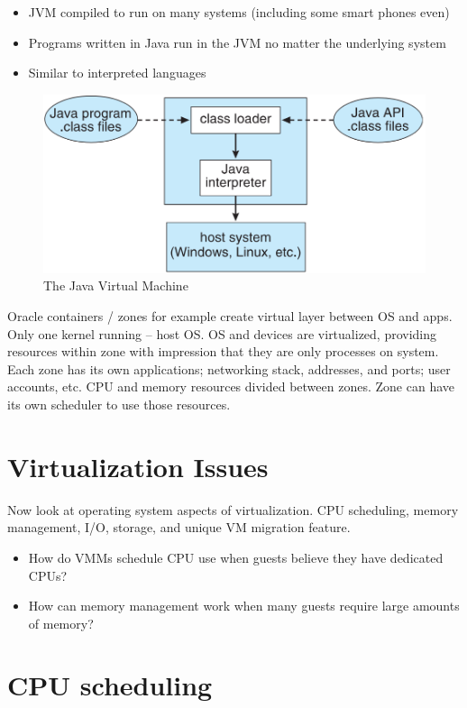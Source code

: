 \begin{itemize}
    \item JVM compiled to run on many systems (including some smart phones even)
    \item Programs written in Java run in the JVM no matter the underlying system
    \item Similar to interpreted languages
\end{itemize}

\begin{figure}[h!]
    \centering
    \includegraphics[width=0.5\linewidth]{img/fsbbfdvsbfs.png}
    \caption{The Java Virtual Machine}
\end{figure}

Oracle containers / zones for example create virtual layer between OS and apps. Only one kernel running – host OS. OS and devices are virtualized, providing resources within zone
with impression that they are only processes on system. Each zone has its own applications; networking stack, addresses,
and ports; user accounts, etc. CPU and memory resources divided between zones. Zone can have its own scheduler to use those resources.


\section{Virtualization Issues}

Now look at operating system aspects of virtualization. CPU scheduling, memory management, I/O, storage, and unique
VM migration feature.

\begin{itemize}
    \item[] How do VMMs schedule CPU use when guests believe they have dedicated CPUs?
    \item[] How can memory management work when many guests require large amounts of memory?
\end{itemize}

\section{CPU scheduling}

